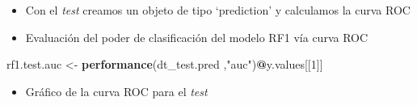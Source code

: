 \documentclass[]{book}
\newenvironment{Shaded}{\begin{snugshade}}{\end{snugshade}}
\newcommand{\DataTypeTok}[1]{\textcolor[rgb]{0.13,0.29,0.53}{#1}}
\newcommand{\DecValTok}[1]{\textcolor[rgb]{0.00,0.00,0.81}{#1}}
\newcommand{\KeywordTok}[1]{\textcolor[rgb]{0.13,0.29,0.53}{\textbf{#1}}}
\newcommand{\NormalTok}[1]{#1}
\newcommand{\OperatorTok}[1]{\textcolor[rgb]{0.81,0.36,0.00}{\textbf{#1}}}
\newcommand{\StringTok}[1]{\textcolor[rgb]{0.31,0.60,0.02}{#1}}
\providecommand{\tightlist}{%
  \setlength{\itemsep}{0pt}\setlength{\parskip}{0pt}}
\begin{document}
\begin{itemize}
\tightlist
\item
  Con el \emph{test} creamos un objeto de tipo `prediction' y calculamos la curva ROC
\end{itemize}

\begin{Shaded}
\end{Shaded}

\begin{itemize}
\tightlist
\item
  Evaluación del poder de clasificación del modelo RF1 vía curva ROC
\end{itemize}

\begin{Shaded}
\begin{Highlighting}[]
\NormalTok{rf1.test.auc <-}\StringTok{ }\KeywordTok{performance}\NormalTok{(dt_test.pred ,}\StringTok{"auc"}\NormalTok{)}\OperatorTok{@}\NormalTok{y.values[[}\DecValTok{1}\NormalTok{]]}
\end{Highlighting}
\end{Shaded}

\begin{itemize}
\tightlist
\item
  Gráfico de la curva ROC para el \emph{test}
\end{itemize}
\end{document}
